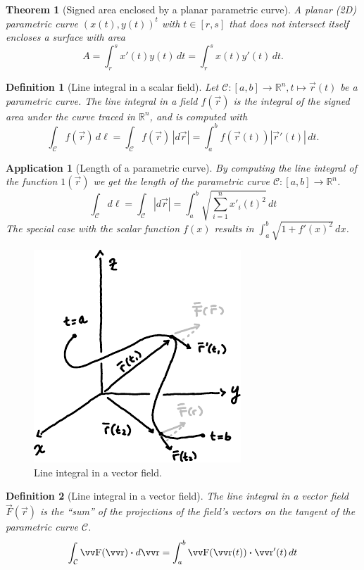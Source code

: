 \documentclass[twocolumn, margin=small]{tex/hsrzf}
\theoremstyle{fuvarzf}
\newtheorem{theorem}{Theorem}
\newtheorem{application}{Application}
\newtheorem{definition}{Definition}
\begin{document}
\begin{theorem}[Signed area enclosed by a planar parametric curve]
  A planar (2D) parametric curve \((x(t), y(t))^t\) with \(t\in[r,s]\) that does
  not intersect itself encloses a surface with area
  \[
    A = \int_r^s x'(t)y(t) \,dt
      = \int_r^s x(t)y'(t) \,dt .
  \]
\end{theorem}

\begin{definition}[Line integral in a scalar field]
  Let \(\mathcal{C}:[a,b]\to\mathbb{R}^n, t \mapsto \vec{r}(t)\) be a
  parametric curve. The \emph{line integral} in a field \(f(\vec{r})\) is the
  integral of the signed area under the curve traced in \(\mathbb{R}^n\), and
  is computed with
  \[
    \int_\mathcal{C} f(\vec{r}) \,d\ell 
    = \int_\mathcal{C} f(\vec{r}) \,|d\vec{r}|
    = \int_a^b f(\vec{r}(t)) |\vec{r}'(t)| \, dt .
  \]
\end{definition}

\begin{application}[Length of a parametric curve]
  By computing the line integral of the function \(1(\vec{r})\) we get the
  length of the parametric curve \(\mathcal{C}:[a,b]\to\mathbb{R}^n\).
  \[
    \int_\mathcal{C}d\ell 
    = \int_\mathcal{C} |d\vec{r}|
    = \int_a^b \sqrt{\sum_{i=1}^n x'_i(t)^2} \,dt
  \]
  The special case with the scalar function \(f(x)\) results in
  \(\int_a^b\sqrt{1+f'(x)^2}\,dx\).
\end{application}

\begin{figure}
  \centering
  \includegraphics{img/line-integral}
  \caption{
    Line integral in a vector field.
  }
\end{figure}

\begin{definition}[Line integral in a vector field]
  The line integral in a vector field \(\vec{F}(\vec{r})\) is the ``sum'' of
  the projections of the field's vectors on the tangent of the parametric curve
  \(\mathcal{C}\).
  \[
    \int_\mathcal{C} \vec{F}(\vec{r})\dotp d\vec{r}
    = \int_a^b \vec{F}(\vec{r}(t))\dotp \vec{r}'(t) \,dt
  \]
\end{definition}
\end{document}
